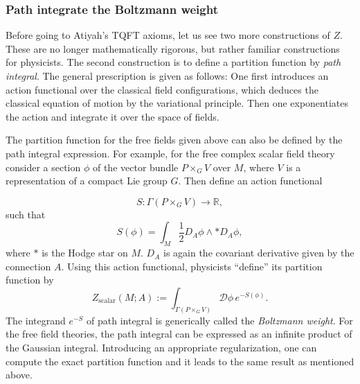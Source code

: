 \subsubsection*{Path integrate the Boltzmann weight}

Before going to Atiyah's TQFT axioms, let us see two more constructions
of $Z$. These are no longer mathematically rigorous, but rather familiar
constructions for physicists. The second construction is to define
a partition function by \emph{path integral}. The general prescription
is given as follows: One first introduces an action functional over
the classical field configurations, which deduces the classical equation
of motion by the variational principle. Then one exponentiates the
action and integrate it over the space of fields.

The partition function for the free fields given above can also be
defined by the path integral expression. For example, for the free
complex scalar field theory consider a section $\phi$ of the vector
bundle $P\times_{G}V$ over $M$, where $V$ is a representation of
a compact Lie group $G$. Then define an action functional

\begin{equation}
  S  :  \Gamma\left(P\times_{G}V\right)  \longrightarrow  \mathbb{R},
\end{equation}
 such that
\begin{equation}
  S\left(\phi\right)  =  \int_{M}\frac{1}{2}D_{A}\phi\wedge\ast D_{A}\phi,
\end{equation}
 where $*$ is the Hodge star on $M$. $D_{A}$ is again the covariant
derivative given by the connection $A$. Using this action functional,
physicists ``define'' its partition function by
\begin{equation}
Z_{\mathrm{scalar}}\left(M;A\right):=\int_{\Gamma\left(P\times_{G}V\right)}\mathcal{D}\phi\,e^{-S\left(\phi\right)}.
\end{equation}
The integrand $e^{-S}$ of path integral is generically called the
\emph{Boltzmann weight}. For the free field theories, the path integral
can be expressed as an infinite product of the Gaussian integral.
Introducing an appropriate regularization, one can compute the exact
partition function and it leads to the same result as mentioned above.

